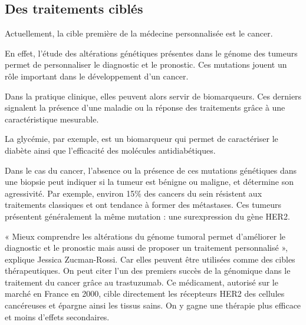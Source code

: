 \documentclass[12pt, openany]{report}
\begin{document}
\subsection{Des traitements ciblés}

Actuellement, la cible première de la médecine personnalisée est le cancer. 

En effet, l’étude des altérations génétiques présentes dans le génome des tumeurs permet de personnaliser le diagnostic et le pronostic. Ces mutations jouent un rôle important dans le développement d’un cancer. 

Dans la pratique clinique, elles peuvent alors servir de biomarqueurs. Ces derniers signalent la présence d’une maladie ou la réponse des traitements grâce à une caractéristique mesurable. 

La glycémie, par exemple, est un biomarqueur qui permet de caractériser le diabète ainsi que l’efficacité des molécules antidiabétiques. 

Dans le cas du cancer, l’absence ou la présence de ces mutations génétiques dans une biopsie peut indiquer si la tumeur est bénigne ou maligne, et détermine son agressivité. Par exemple, environ 15\% des cancers du sein résistent aux traitements classiques et ont tendance à former des métastases. Ces tumeurs présentent généralement la même mutation : une surexpression du gène HER2. 

« Mieux comprendre les altérations du génome tumoral permet d’améliorer le diagnostic et le pronostic mais aussi de proposer un traitement personnalisé », explique Jessica Zucman-Rossi\cite{ZR2013}. Car elles peuvent être utilisées comme des cibles thérapeutiques. On peut citer l’un des premiers succès de la génomique dans le traitement du cancer grâce au trastuzumab. Ce médicament, autorisé sur le marché en France en 2000, cible directement les récepteurs HER2 des cellules cancéreuses et épargne ainsi les tissus sains. On y gagne une thérapie plus efficace et moins d’effets secondaires.
\end{document}
